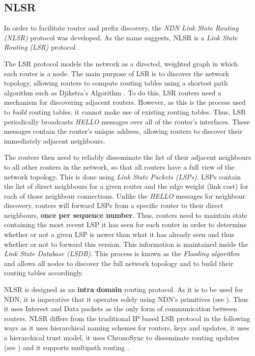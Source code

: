 \subsection{NLSR}\label{sec:NLSR}
In order to facilitate router and prefix discovery, the \textit{NDN Link State Routing (NLSR)} protocol was developed. As the name suggests, NLSR is a \textit{Link State Routing (LSR)} protocol \cite{lsr-rfc}. 

The LSR protocol models the network as a directed, weighted graph in which each router is a node. The main purpose of LSR is to discover the network topology, allowing routers to compute routing tables using a shortest path algorithm such as Djikstra's Algorithm \cite{djikstra}\cite{lsr}. To do this, LSR routers need a mechanism for discovering adjacent routers. However, as this is the process used to \textit{build} routing tables, it cannot make use of existing routing tables. Thus, LSR periodically broadcasts \textit{HELLO} messages over all of the router's interfaces. These messages contain the router's unique address, allowing routers to discover their immediately adjacent neighbours. 

The routers then need to reliably disseminate the list of their adjacent neighbours to all other routers in the network, so that all routers have a full view of the network topology. This is done using \textit{Link State Packets (LSPs)}. LSPs contain the list of direct neighbours for a given router and the edge weight (link cost) for each of those neighbour connections. Unlike the \textit{HELLO} messages for neighbour discovery, routers will forward LSPs from a specific router to their direct neighbours, \textbf{once per sequence number}. Thus, routers need to maintain state containing the most recent LSP it has seen for each router in order to determine whether or not a given LSP is newer than what it has already seen and thus whether or not to forward this version. This information is maintained inside the \textit{Link State Database (LSDB)}. This process is known as the \textit{Flooding algorithm} and allows all nodes to discover the full network topology and to build their routing tables accordingly.

NLSR is designed as an \textbf{intra domain} routing protocol. As it is to be used for NDN, it is imperative that it operates solely using NDN's primitives (see ). Thus it uses Interest and Data packets as the only form of communication between routers. NLSR differs from the traditional IP based LSR protocol in the following ways as it uses hierarchical naming schemes for routers, keys and updates, it uses a hierarchical trust model, it uses ChronoSync to disseminate routing updates (see ) and it supports multipath routing \cite{nlsr}. 


